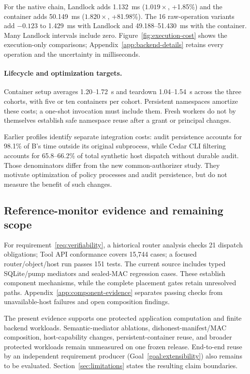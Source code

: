 For the native chain, Landlock adds 1.132~ms ($1.019\times$, +1.85\%) and the
container adds 50.149~ms ($1.820\times$, +81.98\%). The 16 raw-operation
variants add $-0.123$ to 1.429~ms with Landlock and 49.188--51.430~ms with the
container. Many Landlock intervals include zero. Figure~\ref{fig:execution-cost}
shows the execution-only comparisons; Appendix~\ref{app:backend-details}
retains every operation and the uncertainty in milliseconds.


\paragraph{Lifecycle and optimization targets.}
Container setup averages 1.20--1.72~s and teardown 1.04--1.54~s across the three
cohorts, with five or ten containers per cohort. Persistent namespaces amortize
these costs; a one-shot invocation must include them. Fresh workers do not by
themselves establish safe namespace reuse after a grant or principal changes.

Earlier profiles identify separate integration costs: audit persistence accounts
for 98.1\% of B's time outside its original subprocess, while Cedar CLI filtering
accounts for 65.8--66.2\% of total synthetic host dispatch without durable audit.
Those denominators differ from the new common-authorizer study. They motivate
optimization of policy processes and audit persistence, but do not measure the
benefit of such changes.

\subsection{Reference-monitor evidence and remaining scope}

For requirement~\ref{req:verifiability}, a historical router analysis checks 21
dispatch obligations; Tool API conformance
covers 15,744 cases; a focused router/object/host run passes 151 tests. The current
source includes typed SQLite/pump mediators and sealed-MAC regression cases.
These establish component mechanisms, while the complete placement gates retain
unresolved paths. Appendix~\ref{app:component-evidence} separates passing checks
from unavailable-host failures and open composition findings.

The present evidence supports one protected application computation and finite
backend workloads. Semantic-mediator ablations, dishonest-manifest/MAC
composition, host-capability changes, persistent-container reuse, and broader
protected workloads remain unmeasured on one frozen release. End-to-end reuse
by an independent requirement producer (Goal~\ref{goal:extensibility}) also
remains to be evaluated.
Section~\ref{sec:limitations} states the resulting claim boundaries.

